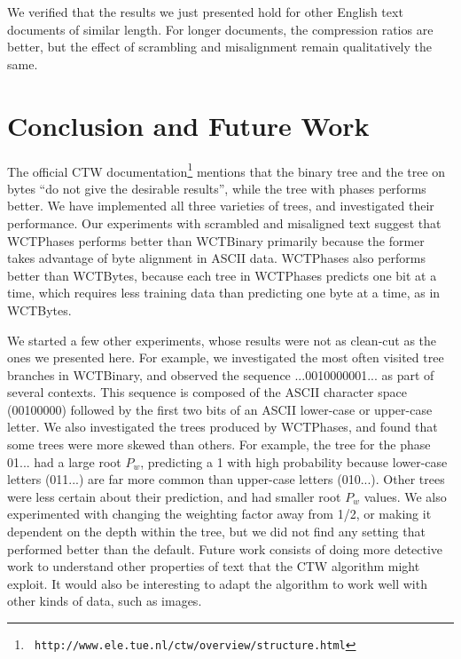 \documentclass[11pt]{scrartcl}
\begin{document}
We verified that the results we just presented hold for other English text
documents of similar length. For longer documents, the compression ratios are
better, but the effect of scrambling and misalignment remain qualitatively the
same.


\section{Conclusion and Future Work}
\label{sec:conclusion}

The official CTW documentation\footnote{{\tt
http://www.ele.tue.nl/ctw/overview/structure.html}} mentions that the binary
tree and the tree on bytes ``do not give the desirable results'', while the
tree with phases performs better. We have implemented all three varieties of
trees, and investigated their performance. Our experiments with scrambled and
misaligned text suggest that WCTPhases performs better than WCTBinary primarily
because the former takes advantage of byte alignment in ASCII data. WCTPhases
also performs better than WCTBytes, because each tree in WCTPhases predicts one
bit at a time, which requires less training data than predicting one byte at a
time, as in WCTBytes.

We started a few other experiments, whose results were not as clean-cut as the
ones we presented here. For example, we investigated the most often visited
tree branches in WCTBinary, and observed the sequence ...0010000001... as part
of several contexts. This sequence is composed of the ASCII character space
(00100000) followed by the first two bits of an ASCII lower-case or upper-case
letter. We also investigated the trees produced by WCTPhases, and found that
some trees were more skewed than others. For example, the tree for the phase
01... had a large root $P_w$, predicting a 1 with high probability because
lower-case letters (011...) are far more common than upper-case letters
(010...). Other trees were less certain about their prediction, and had smaller
root $P_w$ values. We also experimented with changing the weighting factor away
from 1/2, or making it dependent on the depth within the tree, but we did not
find any setting that performed better than the default. Future work consists
of doing more detective work to understand other properties of text that the
CTW algorithm might exploit. It would also be interesting to adapt the
algorithm to work well with other kinds of data, such as images.


\printbibliography
\end{document}

